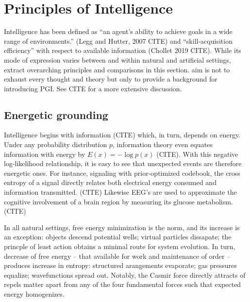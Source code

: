 \documentclass{article}
\begin{document}
\section{Principles of Intelligence}

Intelligence has been defined as ``an agent’s ability to achieve goals in a wide range of environments.'' (Legg and Hutter, 2007 CITE) and ``skill-acquisition efficiency'' with respect to available information (Chollet 2019 CITE). While its mode of expression varies between and within natural and artificial settings, \I extract overarching principles and comparisons in this section. \My aim is not to exhaust every thought and theory but only to provide a background for introducing PGI. See CITE for a more extensive discussion.

\subsection{Energetic grounding}
Intelligence begins with information (CITE) which, in turn, depends on energy. Under any probability distribution $p$, information theory even equates information with energy by $E(x) = - \log{p(x)} $ (CITE). With this negative log-likelihood relationship, it is easy to see that unexpected events are therefore energetic ones. For instance, signaling with prior-optimized codebook, the cross entropy of a signal directly relates both electrical energy consumed and information transmitted. (CITE) Likewise EEG's are used to approximate the cognitive involvement of a brain region by measuring its glucose metabolism. (CITE)

In all natural settings, free energy minimization is the norm, and its increase is an exception: objects descend potential wells; virtual particles dissapate; the princple of least action obtains a minimal route for system evolution. In turn, decrease of free energy -- that available for work and maintenance of order -- produces increase in entropy: structured arangements evaporate; gas pressures equalize; wavefunctions spread out. Notably, the Casmir force directly attracts of repels matter apart from any of the four fundamental forces such that expected energy homogenizes. 
\end{document}
